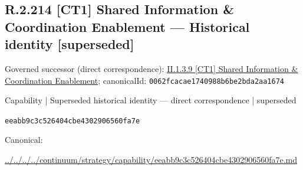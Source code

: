 \documentclass[10pt,a4paper]{article}
\begin{document}
\subsection*{R.2.214 [CT1] Shared Information \& Coordination Enablement — Historical identity [superseded]}
Governed successor (direct correspondence): \hyperref[element-0062fcacae1740988b6be2bda2aa1674]{II.1.3.9 [CT1] Shared Information \& Coordination Enablement}; canonicalId: \texttt{0062fcacae1740988b6be2bda2aa1674}\par
\label{element-eeabb9c3c526404cbe4302906560fa7e}
{\small Capability | Superseded historical identity — direct correspondence | superseded}\par
\texttt{eeabb9c3c526404cbe4302906560fa7e}\par
Canonical: \par
{\footnotesize\url{../../../../continuum/strategy/capability/eeabb9c3c526404cbe4302906560fa7e.md}}\par
\end{document}
